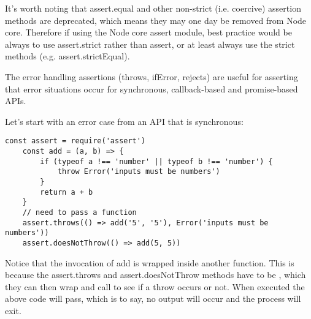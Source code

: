 \documentclass{scrartcl}
\begin{document}
It's worth noting that assert.equal and other non-strict (i.e. coercive) assertion methods are deprecated, which means they may one day be removed from Node core. Therefore if using the Node core assert module, best practice would be always to use assert.strict rather than assert, or at least always use the strict methods (e.g. assert.strictEqual).

The error handling assertions (throws, ifError, rejects) are useful for asserting that error situations occur for synchronous, callback-based and promise-based APIs.

Let's start with an error case from an API that is synchronous:

\begin{lstlisting}[style=ES6]
    const assert = require('assert')
    const add = (a, b) => {
        if (typeof a !== 'number' || typeof b !== 'number') {
            throw Error('inputs must be numbers')
        }
        return a + b
    }
    // need to pass a function
    assert.throws(() => add('5', '5'), Error('inputs must be numbers'))
    assert.doesNotThrow(() => add(5, 5))
\end{lstlisting}

Notice that the invocation of add is wrapped inside another function. This is because the assert.throws and assert.doesNotThrow methods have to be , which they can then wrap and call to see if a throw occurs or not. When executed the above code will pass, which is to say, no output will occur and the process will exit.



\begin{lstlisting}[style=ES6]

\end{lstlisting}

\begin{lstlisting}[style=ES6]

\end{lstlisting}

\begin{lstlisting}[style=ES6]

\end{lstlisting}

\begin{lstlisting}[style=ES6]

\end{lstlisting}

\begin{lstlisting}[style=ES6]

\end{lstlisting}
\end{document}
